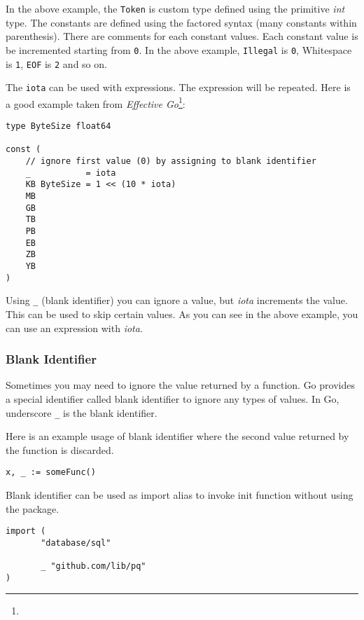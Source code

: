 In the above example, the \texttt{Token} is custom type defined using
the primitive \textit{int} type.  The constants are defined using the
factored syntax (many constants within parenthesis).  There are
comments for each constant values.  Each constant value is be
incremented starting from \texttt{0}.  In the above
example, \texttt{Illegal} is \texttt{0}, Whitespace
is \texttt{1}, \texttt{EOF} is \texttt{2} and so on.

The \texttt{iota} can be used with expressions.  The expression will
be repeated.  Here is a good example taken from \textit{Effective
Go}\footnote{\effgo}:

\begin{lstlisting}[numbers=none]
type ByteSize float64

const (
    // ignore first value (0) by assigning to blank identifier
    _           = iota
    KB ByteSize = 1 << (10 * iota)
    MB
    GB
    TB
    PB
    EB
    ZB
    YB
)
\end{lstlisting}

Using \texttt{\_} (blank identifier) you can ignore a value,
but \textit{iota} increments the value.  This can be used to skip
certain values.  As you can see in the above example, you can use an
expression with \textit{iota}.


\subsubsection{Blank Identifier}

Sometimes you may need to ignore the value returned by a function.  Go
provides a special identifier called blank identifier\index{\_} to ignore any types of values. In Go,
underscore \texttt{\_} is the blank identifier.

Here is an example usage of blank identifier where the second value
returned by the function is discarded.

\begin{lstlisting}[numbers=none]
x, _ := someFunc()
\end{lstlisting}

Blank identifier can be used as import alias to invoke init function
without using the package.

\begin{lstlisting}[numbers=none]
import (
       "database/sql"

       _ "github.com/lib/pq"
)
\end{lstlisting}

